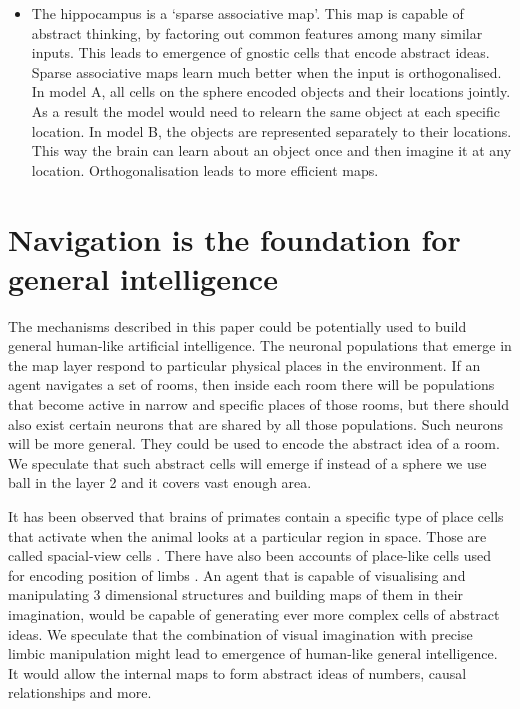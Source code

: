 \documentclass[12pt]{article}
\begin{document}
\begin{itemize}
	\item The hippocampus is a `sparse associative map'. This map is capable of abstract thinking, by factoring out common features among many similar inputs.
	This leads to emergence of gnostic cells that encode abstract ideas. Sparse associative maps learn much better when the input is orthogonalised. In model A, all cells on the sphere encoded objects and  their locations jointly. As a result the model would need to relearn the same object at each specific location. In model B, the objects are represented separately to their locations. This way the brain can learn about an object once and then imagine it at any location. Orthogonalisation leads to more efficient maps.
	
\end{itemize}










\section{Navigation is the foundation for general intelligence}

The mechanisms described in this paper could be potentially used to build general human-like artificial intelligence. The neuronal populations that emerge in the map layer 
respond to particular physical places in the environment. If an agent navigates a set of rooms, then inside each room there will be populations that become active in narrow and specific places of those rooms, but there should also exist certain neurons that are shared by all those populations. Such neurons will be more general. They could be used to encode the abstract idea of a room. We speculate that such abstract cells will emerge if instead of a sphere we use ball in the layer 2 and it covers vast enough area. 

It has been observed that brains of primates contain a specific type of place cells that activate when the animal looks at a particular region in space. Those are called spacial-view cells \cite{Spatial_view_cells}. There have also been accounts of place-like cells used for encoding position of limbs \cite{Place_Cell_Like_Activity_in_the_Primary_Sensorimotor}.
An agent that is capable of visualising and manipulating 3 dimensional structures and building maps of them in their imagination, would be capable of generating ever more complex cells of abstract ideas. We speculate that the combination of visual imagination with precise limbic manipulation might lead to emergence of human-like general intelligence. It would allow the internal maps to form abstract ideas of numbers, causal relationships and more. 
\end{document}
